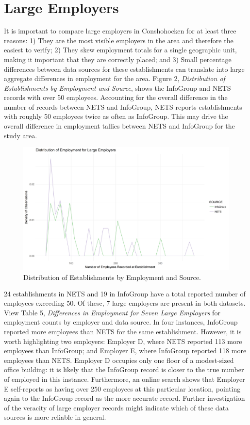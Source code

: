 \documentclass[paper = letter, fontsize = 11pt]{scrartcl}
\begin{document}
\section{Large Employers}
It is important to compare large employers in Conshohocken for at least three reasons: 1) They are the most visible employers in the area and therefore the easiest to verify; 2) They skew employment totals for a single geographic unit, making it important that they are correctly placed; and 3) Small percentage differences between data sources for these establishments can translate into large aggregate differences in employment for the area. Figure 2, \textit{Distribution of Establishments by Employment and Source}, shows the InfoGroup and NETS records with over 50 employees. Accounting for the overall difference in the number of records between NETS and InfoGroup, NETS reports establishments with roughly 50 employees twice as often as InfoGroup. This may drive the overall difference in employment tallies between NETS and InfoGroup for the study area.\par
\begin{figure}[h]
	\includegraphics[width = \textwidth]{frequencyLgEmp}
	\caption{Distribution of Establishments by Employment and Source.}
\end{figure}
24 establishments in NETS and 19 in InfoGroup have a total reported number of employees exceeding 50. Of these, 7 large employers are present in both datasets. View Table 5, \textit{Differences in Employment for Seven Large Employers} for employment counts by employer and data source. In four instances, InfoGroup reported more employees than NETS for the same establishment. However, it is worth highlighting two employers: Employer D, where NETS reported 113 more employees than InfoGroup; and Employer E, where InfoGroup reported 118 more employees than NETS. Employer D occupies only one floor of a modest-sized office building: it is likely that the InfoGroup record is closer to the true number of employed in this instance. Furthermore, an online search shows that Employer E self-reports as having over 250 employees at this particular location, pointing again to the InfoGroup record as the more accurate record. Further investigation of the veracity of large employer records might indicate which of these data sources is more reliable in general.
\end{document}
